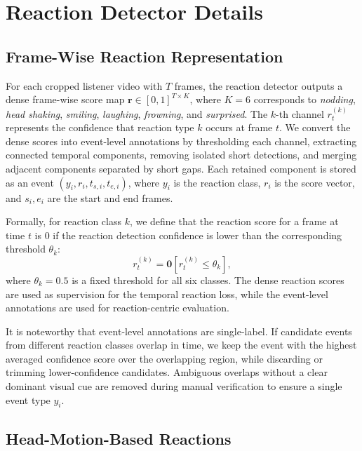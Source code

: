 \section{Reaction Detector Details}
\label{app:reaction_detector}

\subsection{Frame-Wise Reaction Representation}
\label{app:reaction_representation}

For each cropped listener video with $T$ frames, the reaction detector outputs a dense frame-wise score map $\mathbf{r}\in[0,1]^{T\times K}$, where $K=6$ corresponds to \textit{nodding}, \textit{head shaking}, \textit{smiling}, \textit{laughing}, \textit{frowning}, and \textit{surprised}. The $k$-th channel $r^{(k)}_t$ represents the confidence that reaction type $k$ occurs at frame $t$. We convert the dense scores into event-level annotations by thresholding each channel, extracting connected temporal components, removing isolated short detections, and merging adjacent components separated by short gaps. Each retained component is stored as an event $(y_i,r_i,t_{s,i},t_{e,i})$, where $y_i$ is the reaction class, $r_i$ is the score vector, and $s_i,e_i$ are the start and end frames.

Formally, for reaction class $k$, we define that the reaction score for a frame at time $t$ is 0 if the reaction detection confidence is lower than the corresponding threshold $\theta_k$:
\begin{equation}
    r^{(k)}_t = \mathbf{0}\left[r^{(k)}_t \leq \theta_k\right],
\end{equation}
where $\theta_k=0.5$ is a fixed threshold for all six classes. The dense reaction scores are used as supervision for the temporal reaction loss, while the event-level annotations are used for reaction-centric evaluation.

It is noteworthy that event-level annotations are single-label. If candidate
events from different reaction classes overlap in time, we keep the event with
the highest averaged confidence score over the overlapping region, while
discarding or trimming lower-confidence candidates. Ambiguous overlaps without a
clear dominant visual cue are removed during manual verification to ensure a single event type $y_i$.

\subsection{Head-Motion-Based Reactions}
\label{app:head_motion_reactions}

